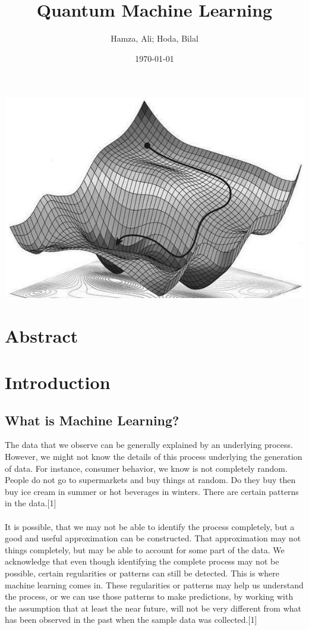 \documentclass[hidelinks,12pt]{article}
\title{Quantum Machine Learning}
\author{Hamza, Ali; Hoda, Bilal}
\date{\today}
\begin{document}
\maketitle

\begin{center}
    \includegraphics[scale = 0.7]{images/title2.jpg}
\end{center}
\newpage

\tableofcontents
\newpage

\section{Abstract}
\newpage
\section{Introduction}
\subsection{What is Machine Learning?}

	\hspace{0.5cm}The data that we observe can be generally explained by an underlying process.
	However, we might not know the details of this process underlying the generation of data. For instance, consumer behavior, we know is not completely random. People do not go to supermarkets and buy things at random. Do they buy then buy ice cream in summer or hot beverages in winters. There are certain patterns in the data.[1]
	\paragraph{}
	It is possible, that we may not be able to identify the process completely, but a good and useful approximation can be constructed. That approximation may not things completely, but may be able to account for some part of the data. We acknowledge that even though identifying the complete process may not be possible, certain regularities or patterns can still be detected. This is where machine learning comes in. These regularities or patterns may help us understand the process, or we can use those patterns to make predictions, by working with the assumption that at least the near future, will not be very different from what has been observed in the past when the sample data was collected.[1]
\end{document}
